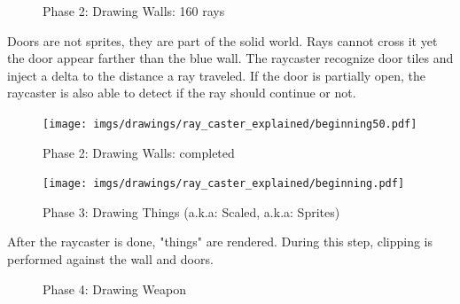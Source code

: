  
\begin{figure}[H]
 \centering
 \caption{Phase 2: Drawing Walls: 160 rays}  
\end{figure}
 \begin{minipage}{.4\textwidth}
 Doors are not sprites, they are part of the solid world. Rays cannot cross it yet the door appear farther than the blue wall. The raycaster recognize door tiles and inject a delta to the distance a ray traveled. If the door is partially open, the raycaster is also able to detect if the ray should continue or not.
 \end{minipage}
\begin{minipage}{.6\textwidth}
\begin{figure}[H]
  \centering
 \texttt{[image: imgs/drawings/ray\_caster\_explained/beginning50.pdf]}
   
\end{figure}
\end{minipage}



 
 \begin{figure}[H]
\centering
 \caption{Phase 2: Drawing Walls: completed} 
 \end{figure}
\begin{minipage}{\textwidth}
\begin{figure}[H]
  \centering
 \texttt{[image: imgs/drawings/ray\_caster\_explained/beginning.pdf]}
   
\end{figure}
\end{minipage}




 
 
 \begin{figure}[H]
\centering
 \caption{Phase 3: Drawing Things (a.k.a: Scaled, a.k.a: Sprites)} 
 \end{figure}
 After the raycaster is done, "things" are rendered. During this step, clipping is performed against the wall and doors.




 \begin{figure}[H]
\centering
 \caption{Phase 4: Drawing Weapon} 
 \end{figure}
 













